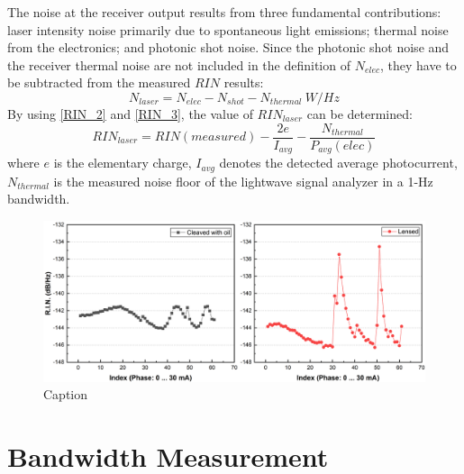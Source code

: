 The noise at the receiver output results from three fundamental contributions: laser intensity noise primarily due to spontaneous light emissions; thermal noise from the electronics; and photonic shot noise. Since the photonic shot noise and the receiver thermal noise are not included in the definition of $N_{elec}$, they have to be subtracted from the measured $RIN$ results:
\begin{equation}
    N_{laser}=N_{elec}-N_{shot}-N_{thermal} \ W/Hz
    \label{RIN_3}
\end{equation}
By using \autoref{RIN_2} and \autoref{RIN_3}, the value of $RIN_{laser}$ can be determined:
\begin{equation}
    RIN_{laser}=RIN(measured)-\frac{2e}{I_{avg}}-\frac{N_{thermal}}{P_{avg}(elec)}
\end{equation}
where $e$ is the elementary charge, $I_{avg}$ denotes the detected average photocurrent, $N_{thermal}$ is the measured noise floor of the lightwave signal analyzer in a 1-Hz bandwidth.
\begin{figure}[ht]
    \centering
    \includegraphics[width=\linewidth]{figures/RIN_cleaved_and_lensed.png}
    \caption{Caption}
    \label{fig:RIN_cleaved_and_lensed}
\end{figure}

\section{Bandwidth Measurement}\label{sec:bandwidth_measurement}
